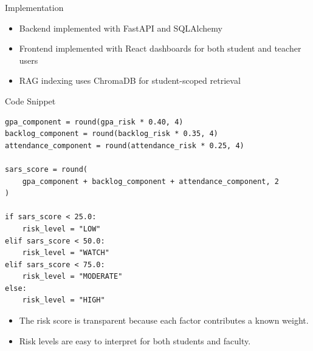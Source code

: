 \documentclass[aspectratio=169]{beamer}
\begin{document}
\begin{frame}{Implementation}
  \centering
  \vspace{0.35cm}
  \begin{itemize}
    \item Backend implemented with FastAPI and SQLAlchemy
    \item Frontend implemented with React dashboards for both student and teacher users
    \item RAG indexing uses ChromaDB for student-scoped retrieval
  \end{itemize}
\end{frame}

\begin{frame}[fragile]{Code Snippet}
  \begin{lstlisting}[style=pythonstyle]
gpa_component = round(gpa_risk * 0.40, 4)
backlog_component = round(backlog_risk * 0.35, 4)
attendance_component = round(attendance_risk * 0.25, 4)

sars_score = round(
    gpa_component + backlog_component + attendance_component, 2
)

if sars_score < 25.0:
    risk_level = "LOW"
elif sars_score < 50.0:
    risk_level = "WATCH"
elif sars_score < 75.0:
    risk_level = "MODERATE"
else:
    risk_level = "HIGH"
  \end{lstlisting}
  \vspace{0.1cm}
  \begin{itemize}
    \item The risk score is transparent because each factor contributes a known weight.
    \item Risk levels are easy to interpret for both students and faculty.
  \end{itemize}
\end{frame}
\end{document}
